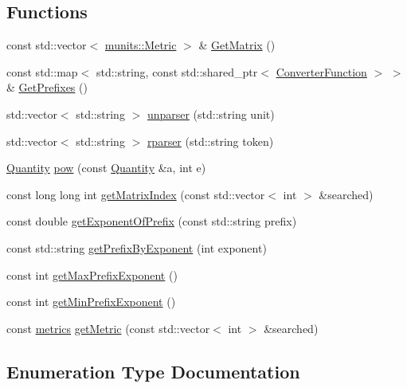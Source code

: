 \subsection*{Functions}
\begin{DoxyCompactItemize}
\item 
const std\+::vector$<$ \hyperlink{structmunits_1_1_metric}{munits\+::\+Metric} $>$ \& \hyperlink{namespacemunits_a8bf80780c6ef4ce5b588d266a2de306e}{Get\+Matrix} ()
\item 
const std\+::map$<$ std\+::string, const std\+::shared\+\_\+ptr$<$ \hyperlink{classmunits_1_1_converter_function}{Converter\+Function} $>$ $>$ \& \hyperlink{namespacemunits_a43150beff0a68af86df9d5a02e69b334}{Get\+Prefixes} ()
\item 
std\+::vector$<$ std\+::string $>$ \hyperlink{namespacemunits_a0035cd1272a835c8d06716a9e866b720}{unparser} (std\+::string unit)
\item 
std\+::vector$<$ std\+::string $>$ \hyperlink{namespacemunits_a10ce8183cbfa4ab0a239a45c56f4dcbe}{rparser} (std\+::string token)
\item 
\hyperlink{classmunits_1_1_quantity}{Quantity} \hyperlink{namespacemunits_a38a90819b6f9b539204ec66e73b60a93}{pow} (const \hyperlink{classmunits_1_1_quantity}{Quantity} \&a, int e)
\item 
const long long int \hyperlink{namespacemunits_a31a640e781f471e914e53e370cdf63ef}{get\+Matrix\+Index} (const std\+::vector$<$ int $>$ \&searched)
\item 
const double \hyperlink{namespacemunits_ad54c1c999ca5e614726f2204bca2b988}{get\+Exponent\+Of\+Prefix} (const std\+::string prefix)
\item 
const std\+::string \hyperlink{namespacemunits_a9ee8078d5f9db8759156a3ff38f9cf39}{get\+Prefix\+By\+Exponent} (int exponent)
\item 
const int \hyperlink{namespacemunits_a49bfbd8f3668a72e3d5404be4a4ee0df}{get\+Max\+Prefix\+Exponent} ()
\item 
const int \hyperlink{namespacemunits_a348f0717c758e64ada5ef3811299af38}{get\+Min\+Prefix\+Exponent} ()
\item 
const \hyperlink{namespacemunits_a22c8effe19fdc3eb888884aa217f0c25}{metrics} \hyperlink{namespacemunits_a252f17286e532b20b64968b1c7f80f7e}{get\+Metric} (const std\+::vector$<$ int $>$ \&searched)
\end{DoxyCompactItemize}


\subsection{Enumeration Type Documentation}
\mbox{\label{namespacemunits_a22c8effe19fdc3eb888884aa217f0c25}} 
